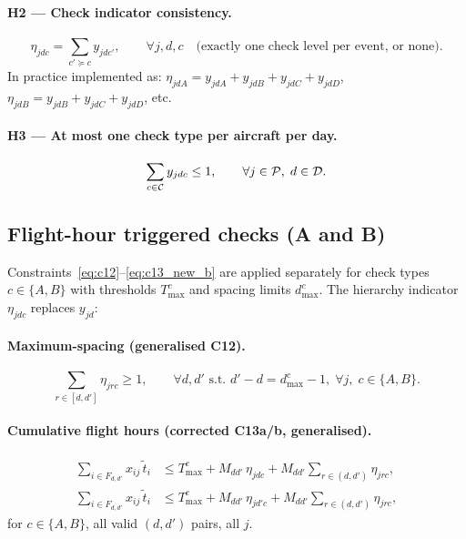 \paragraph{H2 — Check indicator consistency.}
\begin{equation}\label{eq:hier2}
  \eta_{jdc} = \sum_{c' \succeq c} y_{jdc'}, \qquad \forall j,d,c
  \quad \text{(exactly one check level per event, or none)}.
\end{equation}
In practice implemented as: $\eta_{jdA} = y_{jdA} + y_{jdB} + y_{jdC} +
y_{jdD}$, $\eta_{jdB} = y_{jdB} + y_{jdC} + y_{jdD}$, etc.

\paragraph{H3 — At most one check type per aircraft per day.}
\begin{equation}\label{eq:hier3}
  \sum_{c \in \mathcal{C}} y_{jdc} \le 1, \qquad \forall j \in \mathcal{P},\; d \in \mathcal{D}.
\end{equation}

\subsection{Flight-hour triggered checks (A and B)}

Constraints~\eqref{eq:c12}--\eqref{eq:c13_new_b} are applied separately for
check types $c \in \{A, B\}$ with thresholds $T^c_{\max}$ and spacing limits
$d^c_{\max}$.  The hierarchy indicator $\eta_{jdc}$ replaces $y_{jd}$:

\paragraph{Maximum-spacing (generalised C12).}
\begin{equation}\label{eq:c12_abcd}
  \sum_{r \in [d,d']} \eta_{jrc} \ge 1,
  \qquad \forall d,d' \text{ s.t.\ } d'-d = d^c_{\max}-1,\;
  \forall j,\; c \in \{A,B\}.
\end{equation}

\paragraph{Cumulative flight hours (corrected C13a/b, generalised).}
\begin{align}
  \sum_{i \in F_{d,d'}} x_{ij}\,\tilde{t}_i
  &\le T^c_{\max} + M_{dd'}\,\eta_{jdc}
  + M_{dd'}\!\sum_{r \in (d,d')} \eta_{jrc},
  \label{eq:c13a_abcd}\\
  \sum_{i \in F_{d,d'}} x_{ij}\,\tilde{t}_i
  &\le T^c_{\max} + M_{dd'}\,\eta_{jd'c}
  + M_{dd'}\!\sum_{r \in (d,d')} \eta_{jrc},
  \label{eq:c13b_abcd}
\end{align}
for $c \in \{A, B\}$, all valid $(d,d')$ pairs, all $j$.


